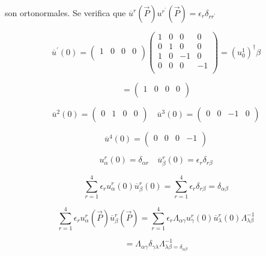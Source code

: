 \documentclass{report}
\begin{document}
son ortonormales. Se verifica que $\overline{u}^{r}(\overrightarrow{P}) u^{r^{\prime}}(\overrightarrow{P}) = \epsilon_{r} \delta_{rr^{\prime}}$

\[\overline{u}^{\prime}(0) = \left ( \begin{array}{cccc}
 1 & 0 & 0 & 0  \\
 \end{array} \right)
 \left ( \begin{array}{cccc}
 1 & 0 & 0 & 0  \\
 0 & 1 & 0 & 0 \\
 1 & 0 & -1 & 0 \\
 0 & 0 & 0 & -1 \\
 \end{array} \right) = (u_{0}^{1})^{\dagger}\beta
 \]

\[= \left ( \begin{array}{c}
 1 & 0 & 0 & 0  \\
 \end{array} \right)\]

\[\overline{u}^2 (0) = \left ( \begin{array}{c}
 0 & 1 & 0 & 0  \\
 \end{array} \right)
\quad \overline{u}^3 (0) = \left ( \begin{array}{c}
 0 & 0 & -1 & 0  \\
 \end{array} \right) 
 \]

\[\overline{u}^4 (0) = \left ( \begin{array}{c}
 0 & 0 & 0 & -1  \\
 \end{array} \right) \]

\[u_{\alpha}^{r}(0) = \delta_{\alpha r} \quad \overline{u}_{\beta}^{r}(0) = \epsilon_{r} \delta_{r \beta}\]

\[\sum_{r = 1}^{4} \epsilon_{r} u_{\alpha}^{r} (0) \overline{u}_{\beta}^{r} (0) = \sum_{r=1}^{4} \epsilon_{r} \delta_{r \beta} = \delta_{\alpha \beta} \]

\[\sum_{r = 1}^{4} \epsilon_{r} u_{\alpha}^{r} (\overrightarrow{P}) \overline{u}_{\beta}^{r}(\overrightarrow{P}) = \sum_{r = 1}^{4} \epsilon_{r} \Lambda_{\alpha \gamma} u_{\gamma}^{r}(0) \overline{u}_{\lambda}^{r}(0)\Lambda^{-1}_{\lambda \beta}  \]

\begin{equation}
= \Lambda_{\alpha \gamma} \delta_{\gamma \lambda} \Lambda^{-1}_{\lambda \beta = \delta_{\alpha \beta}}
\end{equation}
\end{document}

